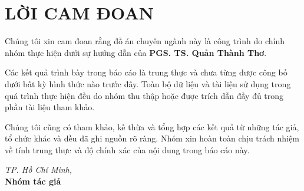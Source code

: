 \chapter*{LỜI CAM ĐOAN}
Chúng tôi xin cam đoan rằng đồ án chuyên ngành này là công trình do chính nhóm thực hiện dưới sự hướng dẫn của \textbf{PGS. TS. Quản Thành Thơ}.

Các kết quả trình bày trong báo cáo là trung thực và chưa từng được công bố dưới bất kỳ hình thức nào trước đây. Toàn bộ dữ liệu và tài liệu sử dụng trong quá trình thực hiện đều do nhóm thu thập hoặc được trích dẫn đầy đủ trong phần tài liệu tham khảo.

Chúng tôi cũng có tham khảo, kế thừa và tổng hợp các kết quả từ những tác giả, tổ chức khác và đều đã ghi nguồn rõ ràng. Nhóm xin hoàn toàn chịu trách nhiệm về tính trung thực và độ chính xác của nội dung trong báo cáo này.

\vspace{2cm}
\begin{flushright}
    \textit{TP. Hồ Chí Minh, \the\year} \\
    \textbf{Nhóm tác giả}
    
\end{flushright}